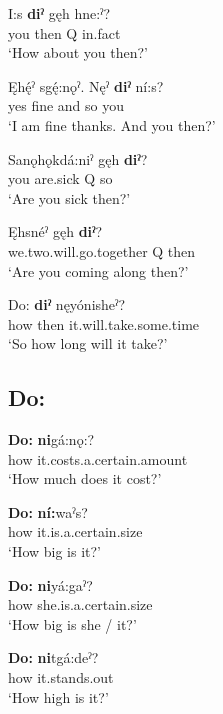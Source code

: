 \ea
\label{ex:dpart23}
\gll I:s \textbf{diˀ} gęh hne:ˀ? \\
you then Q in.fact\\
\glt ‘How about you then?’
\z

\ea
\label{ex:dpart24}
\gll Ęhę́ˀ sgę́:nǫˀ. Nęˀ \textbf{diˀ} ní:s? \\
yes fine and so you\\
\glt ‘I am fine thanks. And you then?’
\z

\ea
\label{ex:dpart25}
\gll Sanǫhǫkdá:niˀ gęh \textbf{diˀ}? \\
you are.sick Q so\\
\glt ‘Are you sick then?’
\z

\ea
\label{ex:dpart26}
\gll Ęhsnéˀ gęh \textbf{diˀ}? \\
we.two.will.go.together Q then\\
\glt ‘Are you coming along then?’
\z

\ea
\label{ex:dpart27}
\gll Do: \textbf{diˀ} nęyónisheˀ? \\ 
how then it.will.take.some.time\\
\glt ‘So how long will it take?’
\z


\subsection*{\textbf{Do:} } \label{p:[do:]}

\ea
\label{ex:dpart41}
\gll \textbf{Do:} \textbf{ni}gá:nǫ:? \\
how it.costs.a.certain.amount \\
\glt ‘How much does it cost?’
\z

\ea
\label{ex:dpart42}
\gll \textbf{Do:} \textbf{ní:}waˀs?\\
how it.is.a.certain.size\\
\glt ‘How big is it?’
\z

\ea
\label{ex:dpart43}
\gll \textbf{Do:} \textbf{ni}yá:gaˀ?\\
how she.is.a.certain.size \\
\glt ‘How big is she / it?’
\z

\ea
\label{ex:dpart44}
\gll \textbf{Do:} \textbf{ni}tgá:deˀ? \\
how it.stands.out \\
\glt ‘How high is it?’
\z

